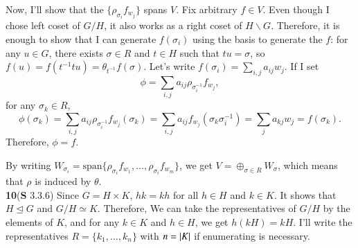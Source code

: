 \documentclass[a4paper, 12pt]{article}
\theoremstyle{Mydefinition}
\theoremstyle{Mytheorem}
\begin{document}
Now, I'll show that the $\{\rho_{\sigma_i}f_{w_j}\}$ spans $V$. Fix arbitrary $f\in V$. Even though I chose left coset of $G/H$, it also works as a right coset of $H\backslash G$. Therefore, it is enough to show that I can generate $f(\sigma_i)$ using the basis to generate the $f$: for any $u\in G$, there exists $\sigma\in R$ and $t\in H$ such that $tu=\sigma$, so $f(u) = f(t^{-1}tu) = \theta_{t^{-1}}f(\sigma)$. Let's write $f(\sigma_i) = \sum_{i,j}a_{ij}w_j$. If I set
\begin{equation}
    \phi = \sum_{i,j}a_{ij}\rho_{\sigma^{-1}_i}f_{w_j},
\end{equation}
for any $\sigma_k\in R$,
\begin{equation}
    \phi(\sigma_k) = \sum_{i,j}a_{ij}\rho_{\sigma^{-1}_i}f_{w_j}(\sigma_k) = \sum_{i,j}a_{ij}f_{w_j}(\sigma_k\sigma^{-1}_i) = \sum_j a_{kj}w_j = f(\sigma_k).
\end{equation}
Therefore, $\phi=f$. 

By writing $W_{\sigma_i} = \mathrm{span}\{\rho_{\sigma_i}f_{w_1}, \ldots, \rho_{\sigma_i}f_{w_m}\}$, we get $V = \oplus_{\sigma\in R}W_\sigma$, which means that $\rho$ is induced by $\theta$.\\

\noindent \textbf{10}(\textbf{S} 3.3.6)
Since $G=H\times K$, $hk=kh$ for all $h\in H$ and $k\in K$. It shows that $H \trianglelefteq G$ and $G/H\simeq K$. Therefore, We can take the representatives of $G/H$ by the elements of $K$, and for any $k\in K$ and $h\in H$, we get $h(kH) = kH$. I'll write the representatives $R = \{k_1, \ldots, k_n\}$ with $n=\abs{K}$ if enumerating is necessary.
\end{document}
